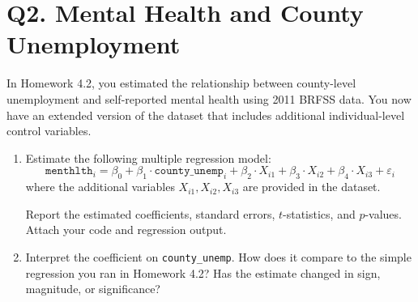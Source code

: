 \documentclass[12pt]{article}
\begin{document}
\section*{Q2. Mental Health and County Unemployment}

In Homework 4.2, you estimated the relationship between county-level unemployment and self-reported mental health using 2011 BRFSS data. You now have an extended version of the dataset that includes additional individual-level control variables.

\begin{enumerate}[label=\alph*)]
    \item Estimate the following multiple regression model:
    \[
    \texttt{menthlth}_i = \beta_0 + \beta_1 \cdot \texttt{county\_unemp}_i + \beta_2 \cdot X_{i1} + \beta_3 \cdot X_{i2} + \beta_4 \cdot X_{i3} + \varepsilon_i
    \]
    where the additional variables \(X_{i1}, X_{i2}, X_{i3}\) are provided in the dataset.

    Report the estimated coefficients, standard errors, $t$-statistics, and $p$-values. Attach your code and regression output.


    \vspace{5cm}
    
    \item Interpret the coefficient on \texttt{county\_unemp}. How does it compare to the simple regression you ran in Homework 4.2? Has the estimate changed in sign, magnitude, or significance?
    
    \vspace{5cm}
\end{enumerate}
\end{document}
